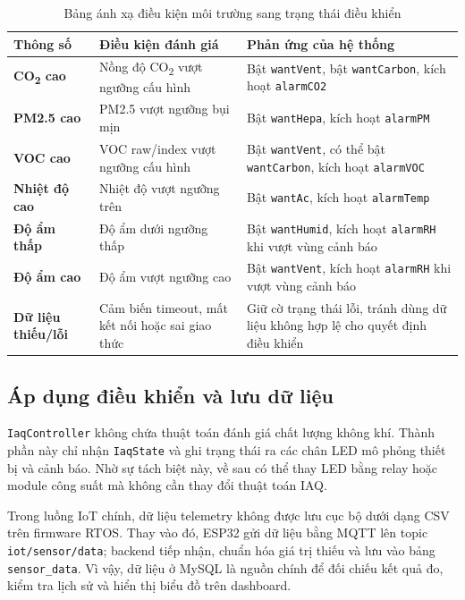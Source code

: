 \begin{table}[H]
    \centering
    \caption{Bảng ánh xạ điều kiện môi trường sang trạng thái điều khiển}
    \begin{tabularx}{\textwidth}{>{\bfseries}l X X}
        \toprule
        Thông số & Điều kiện đánh giá & Phản ứng của hệ thống \\
        \midrule
        CO\textsubscript{2} cao & Nồng độ CO\textsubscript{2} vượt ngưỡng cấu hình & Bật \texttt{wantVent}, bật \texttt{wantCarbon}, kích hoạt \texttt{alarmCO2} \\
        PM2.5 cao & PM2.5 vượt ngưỡng bụi mịn & Bật \texttt{wantHepa}, kích hoạt \texttt{alarmPM} \\
        VOC cao & VOC raw/index vượt ngưỡng cấu hình & Bật \texttt{wantVent}, có thể bật \texttt{wantCarbon}, kích hoạt \texttt{alarmVOC} \\
        Nhiệt độ cao & Nhiệt độ vượt ngưỡng trên & Bật \texttt{wantAc}, kích hoạt \texttt{alarmTemp} \\
        Độ ẩm thấp & Độ ẩm dưới ngưỡng thấp & Bật \texttt{wantHumid}, kích hoạt \texttt{alarmRH} khi vượt vùng cảnh báo \\
        Độ ẩm cao & Độ ẩm vượt ngưỡng cao & Bật \texttt{wantVent}, kích hoạt \texttt{alarmRH} khi vượt vùng cảnh báo \\
        Dữ liệu thiếu/lỗi & Cảm biến timeout, mất kết nối hoặc sai giao thức & Giữ cờ trạng thái lỗi, tránh dùng dữ liệu không hợp lệ cho quyết định điều khiển \\
        \bottomrule
    \end{tabularx}
\end{table}

\subsection{Áp dụng điều khiển và lưu dữ liệu}

\texttt{IaqController} không chứa thuật toán đánh giá chất lượng không khí. Thành phần
này chỉ nhận \texttt{IaqState} và ghi trạng thái ra các chân LED mô phỏng thiết bị và
cảnh báo. Nhờ sự tách biệt này, về sau có thể thay LED bằng relay hoặc module công suất
mà không cần thay đổi thuật toán IAQ.

Trong luồng IoT chính, dữ liệu telemetry không được lưu cục bộ dưới dạng CSV trên firmware RTOS.
Thay vào đó, ESP32 gửi dữ liệu bằng MQTT lên topic \texttt{iot/sensor/data}; backend tiếp nhận,
chuẩn hóa giá trị thiếu và lưu vào bảng \texttt{sensor\_data}. Vì vậy, dữ liệu ở MySQL là
nguồn chính để đối chiếu kết quả đo, kiểm tra lịch sử và hiển thị biểu đồ trên
dashboard.
